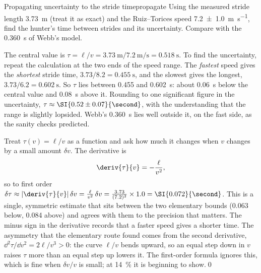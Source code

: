 \begin{example}{Propagating uncertainty to the stride time}{propagate}
Using the measured stride length \SI{3.73}{\metre} (treat it as exact) and the Ruiz--Torices speed \SI{7.2 \pm 1.0}{\metre\per\second}, find the hunter's time between strides and its uncertainty. Compare with the \SI{0.360}{\second} of Webb's model.

\elem The central value is $\tau = \ell/v = \SI{3.73}{\metre}/\SI{7.2}{\metre\per\second} = \SI{0.518}{\second}$. To find the uncertainty, repeat the calculation at the two ends of the speed range. The \emph{fastest} speed gives the \emph{shortest} stride time, $3.73/8.2 = \SI{0.455}{\second}$, and the slowest gives the longest, $3.73/6.2 = \SI{0.602}{\second}$. So $\tau$ lies between \num{0.455} and \SI{0.602}{\second}: about \SI{0.06}{\second} below the central value and \SI{0.08}{\second} above it. Rounding to one significant figure in the uncertainty, $\tau \approx \SI{0.52 \pm 0.07}{\second}$, with the understanding that the range is slightly lopsided. Webb's \SI{0.360}{\second} lies well outside it, on the fast side, as the sanity checks predicted.

\calc Treat $\tau(v) = \ell/v$ as a function and ask how much it changes when $v$ changes by a small amount $\delta v$. The derivative is
\[
\deriv{\tau}{v} = -\frac{\ell}{v^2},
\]
so to first order $\delta\tau \approx \left|\deriv{\tau}{v}\right|\delta v = \frac{\ell}{v^2}\,\delta v = \frac{3.73}{(7.2)^2}\times 1.0 = \SI{0.072}{\second}$. This is a single, symmetric estimate that sits between the two elementary bounds (\num{0.063} below, \num{0.084} above) and agrees with them to the precision that matters. The minus sign in the derivative records that a faster speed gives a shorter time. The asymmetry that the elementary route found comes from the second derivative, $\dd^2\tau/\dd v^2 = 2\ell/v^3 > 0$: the curve $\ell/v$ bends upward, so an equal step down in $v$ raises $\tau$ more than an equal step up lowers it. The first-order formula ignores this, which is fine when $\delta v/v$ is small; at \SI{14}{\percent} it is beginning to show.\qed
\end{example}

